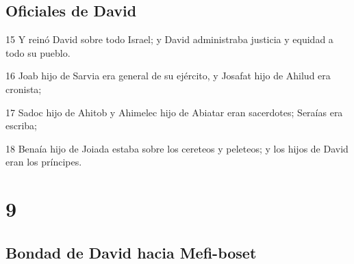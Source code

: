 \section*{Oficiales de David}

\par 15 Y reinó David sobre todo Israel; y David administraba justicia y equidad a todo su pueblo.
\par 16 Joab hijo de Sarvia era general de su ejército, y Josafat hijo de Ahilud era cronista;
\par 17 Sadoc hijo de Ahitob y Ahimelec hijo de Abiatar eran sacerdotes; Seraías era escriba;
\par 18 Benaía hijo de Joiada estaba sobre los cereteos y peleteos; y los hijos de David eran los príncipes.

\chapter{9}

\section*{Bondad de David hacia Mefi-boset}

